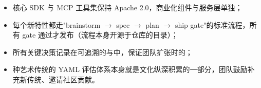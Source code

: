 \begin{itemize}
  \item {}\quad 核心 SDK 与 MCP 工具集保持 Apache 2.0，商业化组件与服务层单独；
  \item {}\quad 每个新特性都走"brainstorm $\to$ spec $\to$ plan $\to$ ship gate"的标准流程，所有 gate 通过才发布（流程本身开源于仓库的目录）；
  \item {}\quad 所有关键决策记录在可追溯的与中，保证团队扩张时的；
  \item {} 种艺术传统的 YAML 评估体系本身就是文化纵深积累的一部分，团队鼓励补充新传统、邀请社区贡献。
\end{itemize}
